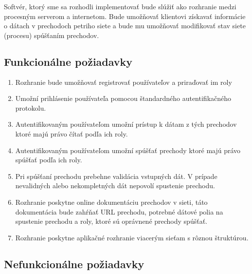   

Softvér, ktorý sme sa rozhodli implementovať bude slúžiť ako rozhranie medzi procesným serverom a internetom. Bude umožňovať klientovi získavať informácie o dátach v prechodoch petriho siete a bude mu umožňovať modifikovať stav siete (procesu) spúšťaním prechodov.  

  

\subsection{Funkcionálne požiadavky} 

\begin{enumerate} 

    \item Rozhranie bude umožňovať registrovať používateľov a priraďovať im roly 

    \item Umožní prihlásenie používateľa pomocou štandardného autentifikačného protokolu. 

    \item Autentifikovaným používateľom umožní prístup k dátam z tých prechodov ktoré majú právo čítať podľa ich roly. 

    \item Autentifikovaným používateľom umožní spúšťať prechody ktoré majú právo spúšťať podľa ich roly. 

    \item Pri spúšťaní prechodu prebehne validácia vstupných dát. V prípade nevalidných alebo nekompletných dát nepovolí spustenie prechodu. 

    \item Rozhranie poskytne online dokumentáciu prechodov v sieti, táto dokumentácia bude zahŕňať URL prechodu, potrebné dátové polia na spustenie prechodu a roly, ktoré sú oprávnené prechody spúšťať. 

    \item Rozhranie poskytne aplikačné rozhranie viacerým sieťam s rôznou štruktúrou. 

\end{enumerate}     

  

  

  

\subsection{Nefunkcionálne požiadavky} 

